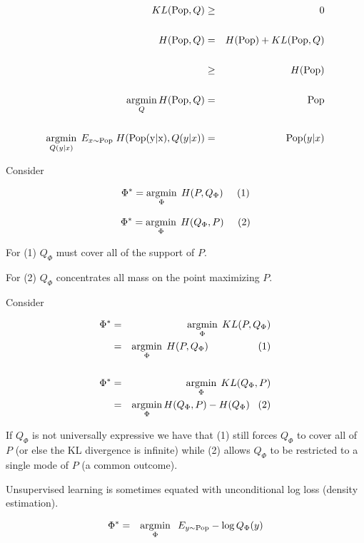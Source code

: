 {

\begin{eqnarray*}
  KL(\mathrm{Pop},Q) & \geq & 0 \\
  \\
  H(\mathrm{Pop},Q) & = & H(\mathrm{Pop}) + KL(\mathrm{Pop},Q) \\
  \\
  & \geq & H(\mathrm{Pop}) \\
  \\
  \operatorname*{argmin}_Q H(\mathrm{Pop},Q) & = & \mathrm{Pop} \\
  \\
  \operatorname*{argmin}_{Q(y|x)}\;E_{x \sim \mathrm{Pop}}\; H(\mathrm{Pop(y|x)}, Q(y|x)) & = & \mathrm{Pop}(y|x) \\
\end{eqnarray*}
    
Consider 


$$\Phi^* = \operatorname*{argmin}_\Phi \;H(P,Q_\Phi)\;\;\;\;\;(1)$$

\vfill
$$\Phi^* = \operatorname*{argmin}_\Phi \;H(Q_\Phi,P)\;\;\;\;\;(2)$$

\vfill
For (1) $Q_\Phi$ must cover all of the support of $P$.

\vfill
For (2) $Q_\Phi$ concentrates all mass on the point maximizing $P$.

    
Consider 


\begin{eqnarray*}
  \Phi^* & = & \operatorname*{argmin}_\Phi \;KL(P,Q_\Phi) \\
  & = & \operatorname*{argmin}_\Phi\; H(P,Q_\Phi)\;\;\;\;\;\;\;\;\;\;\;\;\;\;\;\;\;\;(1) \\
  \\
  \Phi^* & = & \operatorname*{argmin}_\Phi \;KL(Q_\Phi,P) \\
  & = & \operatorname*{argmin}_\Phi H(Q_\Phi,P) - H(Q_\Phi)\;\;\;(2)
  \end{eqnarray*}

\vfill
If $Q_\Phi$ is not universally expressive we have that (1) still forces $Q_\Phi$ to cover all of $P$ (or else the KL divergence is infinite)
while (2) allows $Q_\Phi$ to be restricted to a single mode of $P$ (a common outcome).


Unsupervised learning is sometimes equated with unconditional log loss (density estimation).

\vfill
\begin{eqnarray*}
  \Phi^* & = & \operatorname*{argmin}_\Phi \;\;E_{y \sim \mathrm{Pop}}  -\log Q_\Phi(y)
\end{eqnarray*}

}
